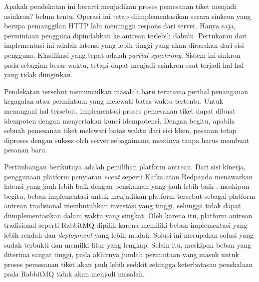 Apakah pendekatan ini berarti menjadikan proses pemesanan tiket menjadi asinkron? belum tentu. Operasi ini tetap diimplementasikan secara sinkron yang berupa pemanggilan HTTP lalu menunggu respons dari server. Hanya saja, permintaan pengguna dipindahkan ke antrean terlebih dahulu. Pertukaran dari implementasi ini adalah latensi yang lebih tinggi yang akan dirasakan dari sisi pengguna. Klasifikasi yang tepat adalah \textit{partial synchrony}. Sistem ini sinkron pada sebagian besar waktu, tetapi dapat menjadi asinkron saat terjadi hal-hal yang tidak diinginkan.

Pendekatan tersebut memunculkan masalah baru terutama perihal penanganan kegagalan atau permintaan yang melewati batas waktu tertentu. Untuk menangani hal tersebut, implementasi proses pemesanan tiket dapat dibuat idempoten dengan menyertakan kunci idempotensi. Dengan begitu, apabila sebuah pemesanan tiket melewati batas waktu dari sisi klien, pesanan tetap diproses dengan sukses oleh server sebagaimana mestinya tanpa harus membuat pesanan baru.

Pertimbangan berikutnya adalah pemilihan platform antrean. Dari sisi kinerja, penggunaan platform penyiaran \textit{event} seperti Kafka atau Redpanda menawarkan latensi yang jauh lebih baik dengan penskalaan yang jauh lebih baik \parencite{comparingKafkaAlternatives}. meskipun begitu, beban implementasi untuk menjadikan platform tersebut sebagai platform antrean tradisional membutuhkan investasi yang tinggi, sehingga tidak dapat diimplementasikan dalam waktu yang singkat. Oleh karena itu, platform antrean tradisional seperti RabbitMQ dipilih karena memiliki beban implementasi yang lebih rendah dan \textit{deployment} yang lebih mudah. Solusi ini merupakan solusi yang sudah terbukti dan memilki fitur yang lengkap. Selain itu, meskipun beban yang diterima sangat tinggi, pada akhirnya jumlah permintaan yang masuk untuk proses pemesanan tiket akan jauh lebih sedikit sehingga keterbatasan penskalaan pada RabbitMQ tidak akan menjadi masalah.
